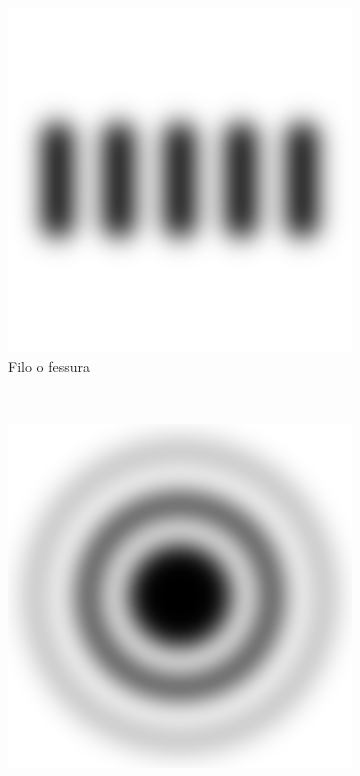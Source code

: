 \begin{figure}[b!]
    \centering
    \begin{subfigure}[b]{0.3\textwidth}
        \includegraphics[width=\textwidth]{f1.png}
        \caption{Filo o fessura}
        \label{fig:ff}
    \end{subfigure}%
    ~ %
    \begin{subfigure}[b]{0.3\textwidth}
        \includegraphics[width=\textwidth]{f2.png}

\end{subfigure}
\end{figure}
